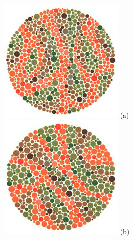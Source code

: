 \documentclass[	12pt, Times, openright, twoside, a4paper, english, brazil]{abntex2}
\begin{document}
\begin{apendicesenv}
\begin{figure}[!htb]
\centering
{\includegraphics[width=\linewidth]{ishihara-digitoescondido/plate18.jpg}}
(a)
\endminipage\hfill
{}
\centering
{\includegraphics[width=\linewidth]{ishihara-digitoescondido/plate19.jpg}}
(b)
\endminipage\hfill


\end{figure}
\end{apendicesenv}
\end{document}
